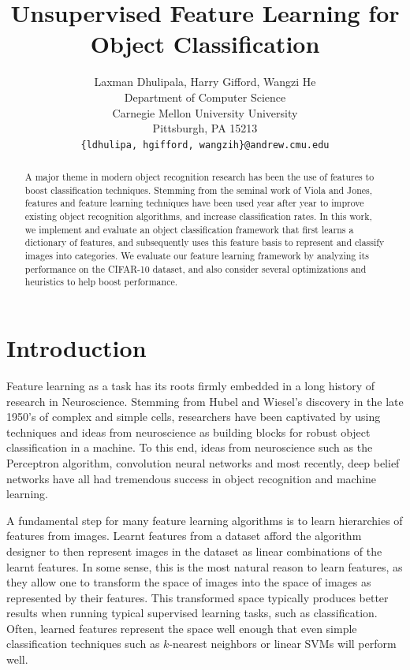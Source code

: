 \documentclass{article} %
\title{Unsupervised Feature Learning for Object Classification}
\author{
  Laxman Dhulipala, Harry Gifford, Wangzi He \\
  Department of Computer Science\\
  Carnegie Mellon University University\\
  Pittsburgh, PA 15213 \\
  \texttt{\{ldhulipa, hgifford, wangzih\}@andrew.cmu.edu} \\
}
\begin{document}
\maketitle

\begin{abstract}
  A major theme in modern object recognition research has been the use of features to boost classification techniques. Stemming from the seminal work of Viola and Jones, features and feature learning techniques have been used year after year to improve existing object recognition algorithms, and increase classification rates. In this work, we implement and evaluate an object classification framework that first learns a dictionary of features, and subsequently uses this feature basis to represent and classify images into categories. We evaluate our feature learning framework by analyzing its performance on the CIFAR-10 dataset, and also consider several optimizations and heuristics to help boost performance.
\end{abstract}

\section{Introduction}

Feature learning as a task has its roots firmly embedded in a long history
of research in Neuroscience. Stemming from Hubel and Wiesel's discovery in the
late 1950's of complex and simple cells, researchers have been captivated by using
techniques and ideas from neuroscience as building blocks for robust object
classification in a machine\cite{hubel}. To this end, ideas from neuroscience such as the Perceptron
algorithm, convolution neural networks and most recently, deep belief networks have all
had tremendous success in object recognition and machine learning.

A fundamental step for many feature learning algorithms is to learn hierarchies
of features from images. Learnt features from a dataset afford the algorithm designer
to then represent images in the dataset as linear combinations of the learnt features.
In some sense, this is the most natural reason to learn features, as they allow one
to transform the space of images into the space of images as represented by their features.
This transformed space typically produces better results when running typical supervised learning tasks, such as classification. Often, learned features represent the space well enough that even simple classification techniques such as $k$-nearest neighbors or linear SVMs will perform well.
\end{document}
